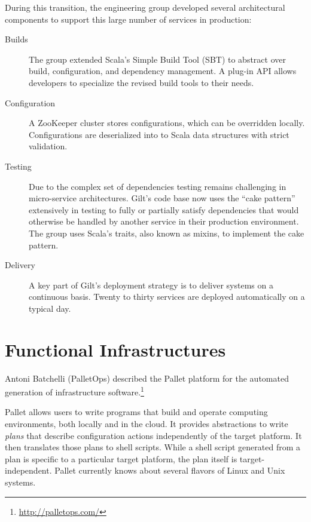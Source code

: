 \documentclass{jfp1}
\begin{document}
During this transition, the engineering group developed several
architectural components to support this large number of services in
production:
\begin{description}
\item[Builds] The group extended Scala's Simple Build Tool (SBT) to
abstract over build, configuration, and dependency management. 
A plug-in API allows developers to specialize the revised build tools to
their needs.

\item[Configuration] A ZooKeeper cluster stores configurations, which can
be overridden locally. Configurations are deserialized into to Scala data
structures with strict validation.

\item[Testing] Due to the complex set of dependencies testing remains
challenging in micro-service architectures.  Gilt's code base now uses the
``cake pattern'' extensively in testing to fully or partially satisfy
dependencies that would otherwise be handled by another service in their
production environment. The group uses Scala's traits, also known as
mixins, to implement the cake pattern.
 
\item[Delivery] A key part of Gilt's deployment strategy is to deliver
systems on a continuous basis. Twenty to thirty services are deployed
automatically on a typical day.
\end{description}

\section{Functional Infrastructures}

Antoni Batchelli (PalletOps) described the Pallet platform for the
automated generation of infrastructure
software.\footnote{\url{http://palletops.com/}}

Pallet allows users to write programs that build and operate computing
environments, both locally and in the cloud. It provides abstractions to
write \textit{plans} that describe configuration actions independently of
the target platform.  It then translates those plans to shell scripts.
While a shell script generated from a plan is specific to a particular
target platform, the plan itself is target-independent.  Pallet currently
knows about several flavors of Linux and Unix systems.
\end{document}
